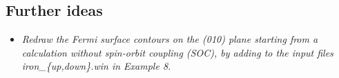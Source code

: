 \begin{itemize}
	\begin{figure}
	\centering
	\centering
	\caption{}\label{fig17.2}
	\end{figure}

	\subsection*{Further ideas}
	\begin{itemize}
		\item {\it Redraw the Fermi surface contours on the (010) plane starting from a calculation without spin-orbit coupling (SOC), by adding to the input files iron\_\{up,down\}.win in Example 8.}


\end{itemize}
\end{itemize}
